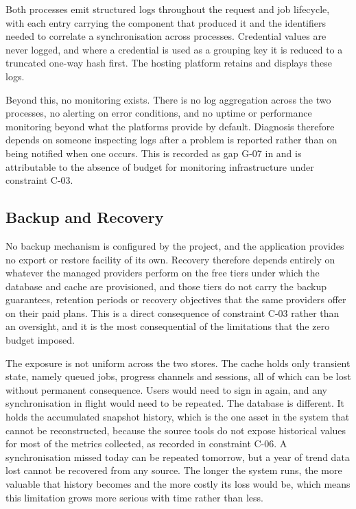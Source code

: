 Both processes emit structured logs throughout the request and job lifecycle,
with each entry carrying the component that produced it and the identifiers
needed to correlate a synchronisation across processes. Credential values are
never logged, and where a credential is used as a grouping key it is reduced to a
truncated one-way hash first. The hosting platform retains and displays these
logs.

Beyond this, no monitoring exists. There is no log aggregation across the two
processes, no alerting on error conditions, and no uptime or performance
monitoring beyond what the platforms provide by default. Diagnosis therefore
depends on someone inspecting logs after a problem is reported rather than on
being notified when one occurs. This is recorded as gap G-07 in
 and is attributable to the absence of budget for monitoring
infrastructure under constraint C-03.

\subsection{Backup and Recovery}
\label{subsec:backup}

No backup mechanism is configured by the project, and the application provides no
export or restore facility of its own. Recovery therefore depends entirely on
whatever the managed providers perform on the free tiers under which the database
and cache are provisioned, and those tiers do not carry the backup guarantees,
retention periods or recovery objectives that the same providers offer on their
paid plans. This is a direct consequence of constraint C-03 rather than an
oversight, and it is the most consequential of the limitations that the zero
budget imposed.

The exposure is not uniform across the two stores. The cache holds only transient
state, namely queued jobs, progress channels and sessions, all of which can be
lost without permanent consequence. Users would need to sign in again, and any
synchronisation in flight would need to be repeated. The database is different.
It holds the accumulated snapshot history, which is the one asset in the system
that cannot be reconstructed, because the source tools do not expose historical
values for most of the metrics collected, as recorded in constraint C-06. A
synchronisation missed today can be repeated tomorrow, but a year of trend data
lost cannot be recovered from any source. The longer the system runs, the more
valuable that history becomes and the more costly its loss would be, which means
this limitation grows more serious with time rather than less.

